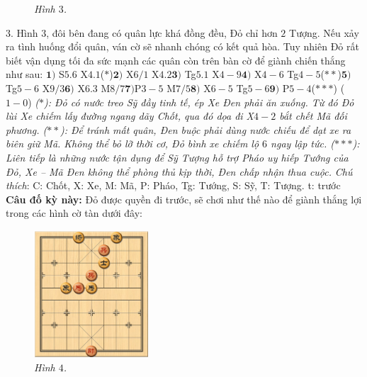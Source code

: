 \begin{multicols}{2}
\begin{figure}[H]
		\caption{\small\textit{\color{gocco}Hình $3$.}}
		\vspace*{-10pt}
	\end{figure}
	$3$. Hình $3$, đôi bên đang có quân lực khá đồng đều, Đỏ chỉ hơn $2$ Tượng. Nếu xảy ra tình huống đổi quân, ván cờ sẽ nhanh chóng có kết quả hòa. Tuy nhiên Đỏ rất biết vận dụng tối đa sức mạnh các quân còn trên bàn cờ để giành chiến thắng như sau: 
	\vskip 0.1cm
	$\pmb{1)}$ S$5.6$ X$4.1$($*$)\quad $\pmb{2)}$ X$6/1$ X$4.2$\quad $\pmb{3)}$ Tg$5.1$ X$4-9$\quad $\pmb{4)}$ X$4-6$ Tg$4-5$($**$)\quad $\pmb{5)}$ Tg$5-6$ X$9/3$\quad  $\pmb{6)}$ X$6.3$ M$8/7$\quad $\pmb{7)}$P$3-5$ M$7/5$\quad $\pmb{8)}$ X$6-5$ Tg$5-6$\quad $\pmb{9)}$ P$5-4$($***$) ($1-0$)
	\vskip 0.1cm
	\textit{($*$): Đỏ có nước treo Sỹ đầy tinh tế, ép Xe Đen phải ăn xuống. Từ đó Đỏ lùi Xe chiếm lấy đường ngang dãy Chốt, qua đó dọa đi X$4-2$ bắt chết Mã đối phương.
	\vskip 0.1cm
	($**$): Để tránh mất quân, Đen buộc phải dùng nước chiếu để dạt xe ra biên giữ Mã. Không thể bỏ lỡ thời cơ, Đỏ bình xe chiếm lộ $6$ ngay lập tức.
	\vskip 0.1cm
	($***$): Liên tiếp là những nước tận dụng để Sỹ Tượng hỗ trợ Pháo uy hiếp Tướng của Đỏ, Xe -- Mã Đen không thể phòng thủ kịp thời, Đen chấp nhận thua cuộc.}
	\vskip 0.1cm
	\textit{Chú thích}: C: Chốt, X: Xe, M: Mã, P: Pháo, Tg: Tướng, S: Sỹ, T: Tượng. t: trước
	\vskip 0.1cm
	\textbf{\color{gocco}Câu đố kỳ này:} Đỏ được quyền đi trước, sẽ chơi như thế nào để giành thắng lợi trong các hình cờ tàn dưới đây:
	\begin{figure}[H]
		\vspace*{-5pt}
		\centering
		\captionsetup{labelformat= empty, justification=centering}
		\includegraphics[width= 0.38\textwidth]{4}
		\caption{\small\textit{\color{gocco}Hình $4$.}}
		\vspace*{-10pt}
	\end{figure}

\end{multicols}
